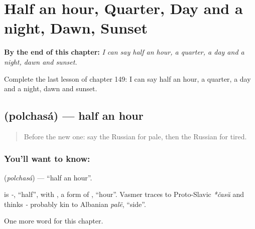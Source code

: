 
\chapter{Half an hour, Quarter, Day and a night, Dawn, Sunset}
\label{ch:ru-half-an-hour-quarter-day-and-a-night-dawn-sunset}

\begin{chapteropening}
\textbf{By the end of this chapter:} \emph{I can say half an hour, a quarter, a day and a night, dawn and sunset.}

Complete the last lesson of chapter 149: I can say half an hour, a quarter, a day and a night, dawn and sunset.
\end{chapteropening}

\section[\texorpdfstring{\ru{полчаса} (polchasá)}{полчаса (polchasá)}]{ (polchasá) — half an hour}

\label{lesson:RU-C149-polchasa}



\begin{quote}
Before the new one: say the Russian for pale, then the Russian for tired.
\end{quote}

\subsection*{You'll want to know: }
\textbf{} (\emph{polchasá}) — \textquotedblleft{}half an hour\textquotedblright{}.

\begin{cousinweb}
\textbf{} is \emph{-}, \textquotedblleft{}half\textquotedblright{}, with \emph{}, a form of \emph{}, \textquotedblleft{}hour\textquotedblright{}. Vasmer traces \emph{} to Proto-Slavic \emph{*časŭ} and thinks \emph{-} probably kin to Albanian \emph{palë}, \textquotedblleft{}side\textquotedblright{}.
\end{cousinweb}

\begin{grammarlens}[title={What you've built}]
One more word for this chapter.
\end{grammarlens}


